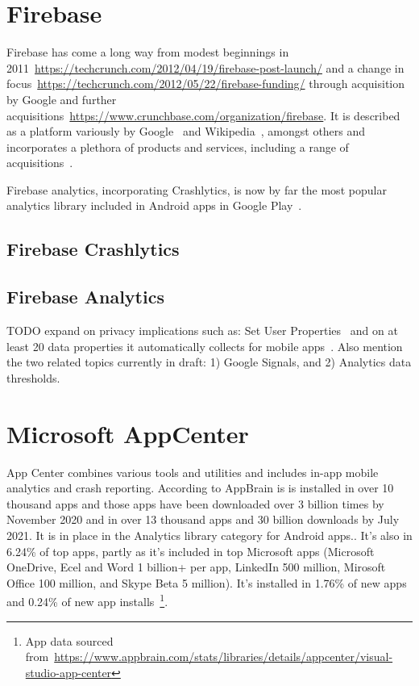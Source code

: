 \section{Firebase}
Firebase has come a long way from modest beginnings in 2011~\url{https://techcrunch.com/2012/04/19/firebase-post-launch/} and a change in focus~\url{https://techcrunch.com/2012/05/22/firebase-funding/} through acquisition by Google and further acquisitions~\url{https://www.crunchbase.com/organization/firebase}. It is described as a platform variously by Google~\citep{firebase_homepage_2021} and Wikipedia~\citep{wikipedia_firebase}, amongst others and incorporates a plethora of products and services, including a range of acquisitions~\citep{wikipedia_firebase}.

Firebase analytics, incorporating Crashlytics, is now by far the most popular analytics library included in Android apps in Google Play~\citep{appbrain_firebase}. 

\subsection{Firebase Crashlytics}

\subsection{Firebase Analytics}
TODO expand on privacy implications such as: Set User Properties~\citep{firebase_help_set_user_properties} and on at least 20 data properties it automatically collects for mobile apps~\citep{firebase_help_GA4_2021_predefined_user_dimensions}. Also mention the two related topics currently in draft: 1) Google Signals, and 2) Analytics data thresholds. 

\section{Microsoft AppCenter}
App Center combines various tools and utilities and includes in-app mobile analytics and crash reporting. According to AppBrain is is installed in over 10 thousand apps and those apps have been downloaded over 3 billion times by  November 2020 and in over 13 thousand apps and 30 billion downloads by  July 2021. It is in  place in the Analytics library category for Android apps.. It's also in 6.24\% of top apps, partly as it's included in top Microsoft apps (Microsoft OneDrive, Ecel and Word 1 billion+ per app, LinkedIn 500 million, Mirosoft Office 100 million, and Skype Beta 5 million). It's installed in 1.76\% of new apps and 0.24\% of new app installs~\footnote{App data sourced from~\url{https://www.appbrain.com/stats/libraries/details/appcenter/visual-studio-app-center}}.  

